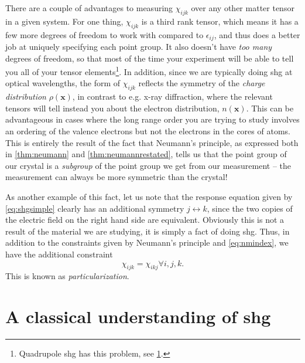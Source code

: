 There are a couple of advantages to measuring $\chi_{ijk}$ over any other matter tensor in a given system.
For one thing, $\chi_{ijk}$ is a third rank tensor, which means it has a few more degrees of freedom to work with compared to $\epsilon_{ij}$, and thus does a better job at uniquely specifying each point group.
It also doesn't have \emph{too many} degrees of freedom, so that most of the time your experiment will be able to tell you all of your tensor elements\footnote{Quadrupole \gls{shg} has this problem, see \cref{sec:manyshgterms}.}.
In addition, since we are typically doing \gls{shg} at optical wavelengths, the form of $\chi_{ijk}$ reflects the symmetry of the \emph{charge distribution} $\rho(\bm{x})$, in contrast to e.g. x-ray diffraction, where the relevant tensors will tell instead you about the electron distribution, $n(\bm{x})$.
This can be advantageous in cases where the long range order you are trying to study involves an ordering of the valence electrons but not the electrons in the cores of atoms.
This is entirely the result of the fact that Neumann's principle, as expressed both in \cref{thm:neumann} and \cref{thm:neumannrestated}, tells us that the point group of our crystal is a \emph{subgroup} of the point group we get from our measurement -- the measurement can always be more symmetric than the crystal!

As another example of this fact, let us note that the response equation given by \cref{eq:shgsimple} clearly has an additional symmetry $j \leftrightarrow k$, since the two copies of the electric field on the right hand side are equivalent.
Obviously this is not a result of the material we are studying, it is simply a fact of doing \gls{shg}.
Thus, in addition to the constraints given by Neumann's principle and \cref{eq:nmindex}, we have the additional constraint
\begin{equation}
\chi_{ijk} = \chi_{ikj} \forall i,j,k.
\end{equation}
This is known as \emph{particularization}\cite{birss}.

\section{A classical understanding of \gls{shg}}\label{sec:manyshgterms}

